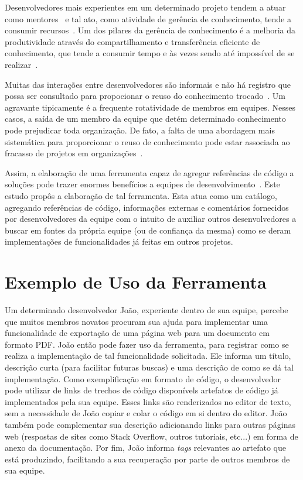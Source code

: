 Desenvolvedores mais experientes em um determinado projeto tendem a atuar como mentores~\cite{CubraniC2004} e tal ato, como atividade de gerência de conhecimento, tende a consumir recursos~\cite{Wiig2003}. Um dos pilares da gerência de conhecimento é a melhoria da produtividade através do compartilhamento e transferência eficiente de conhecimento, que tende a consumir tempo e às vezes sendo até impossível de se realizar~\cite{Levy2009}.

Muitas das interações entre desenvolvedores são informais e não há registro que possa ser consultado para propocionar o reuso do conhecimento trocado~\cite{Olson2000}. Um agravante tipicamente é a frequente rotatividade de membros em equipes. Nesses casos, a saída de um membro da equipe que detém determinado conhecimento pode prejudicar toda organização. De fato, a falta de uma abordagem mais sistemática para proporcionar o reuso de conhecimento pode estar associada ao fracasso de projetos em organizações~\cite{Hall2008}.

Assim, a elaboração de uma ferramenta capaz de agregar referências de código a soluções pode trazer enormes benefícios a equipes de desenvolvimento~\cite{CubraniC2004}. Este estudo propôs a elaboração de tal ferramenta. Esta atua como um catálogo, agregando referências de código, informações externas e comentários fornecidos por desenvolvedores da equipe com o intuito de auxiliar outros desenvolvedores a buscar em fontes da própria equipe (ou de confiança da mesma) como se deram implementações de funcionalidades já feitas em outros projetos.

\section{Exemplo de Uso da Ferramenta}

Um determinado desenvolvedor João, experiente dentro de sua equipe, percebe que muitos membros novatos procuram sua ajuda para implementar uma funcionalidade de exportação de uma página web para um documento em formato PDF. João então pode fazer uso da ferramenta, para registrar como se realiza a implementação de tal funcionalidade solicitada. Ele informa um título, descrição curta (para facilitar futuras buscas) e uma descrição de como se dá tal implementação. Como exemplificação em formato de código, o desenvolvedor pode utilizar de links de trechos de código disponívels artefatos de código já implementados pela sua equipe. Esses links são renderizados no editor de texto, sem a necessidade de João copiar e colar o código em si dentro do editor. João também pode complementar sua descrição adicionando links para outras páginas web (respostas de sites como Stack Overflow, outros tutoriais, etc...) em forma de anexo da documentação. Por fim, João informa \textit{tags} relevantes ao artefato que está produzindo, facilitando a sua recuperação por parte de outros membros de sua equipe.

